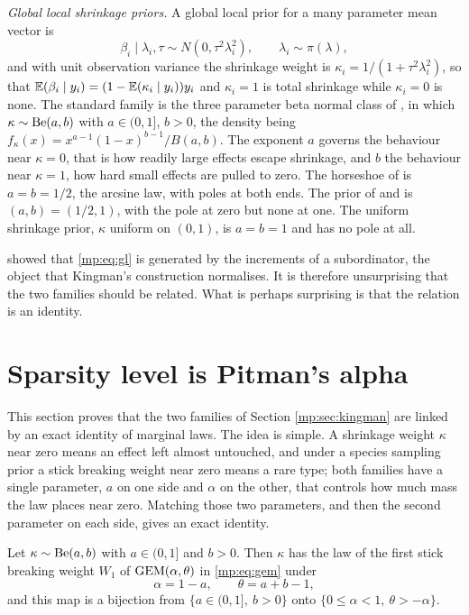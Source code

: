 \medskip
\noindent\emph{Global local shrinkage priors.} A global local prior for a many parameter
mean vector is
\begin{equation}
\beta_i\mid\lambda_i,\tau\sim N(0,\tau^2\lambda_i^2),\qquad \lambda_i\sim\pi(\lambda),
\label{mp:eq:gl}
\end{equation}
and with unit observation variance the shrinkage weight is
$\kappa_i=1/(1+\tau^2\lambda_i^2)$, so that $\mathbb{E}(\beta_i\mid y_i)=(1-\mathbb{E}(\kappa_i\mid y_i))y_i$
and $\kappa_i=1$ is total shrinkage while $\kappa_i=0$ is none. The standard family is the
three parameter beta normal class of \citet{mp:armagan2011}, in which
$\kappa\sim\mathrm{Be}(a,b)$ with $a\in(0,1]$, $b>0$, the density being
$f_\kappa(x)=x^{a-1}(1-x)^{b-1}/B(a,b)$. The exponent $a$ governs the behaviour near
$\kappa=0$, that is how readily large effects escape shrinkage, and $b$ the behaviour near
$\kappa=1$, how hard small effects are pulled to zero. The horseshoe of
\citet{mp:carvalho2010} is $a=b=1/2$, the arcsine law, with poles at both ends. The prior of
\citet{mp:strawderman1971} and \citet{mp:berger1980} is $(a,b)=(1/2,1)$, with the pole at
zero but none at one. The uniform shrinkage prior, $\kappa$ uniform on $(0,1)$, is
$a=b=1$ and has no pole at all.

\citet{mp:polson2012} showed that \eqref{mp:eq:gl} is generated by the increments of a
subordinator, the object that Kingman's construction normalises. It is therefore unsurprising that the two
families should be related. What is perhaps surprising is that the relation is an identity.

\section{Sparsity level is Pitman's alpha}
\label{mp:sec:main}

This section proves that the two families of Section \ref{mp:sec:kingman} are linked by an exact identity of marginal laws. The idea
is simple. A shrinkage weight $\kappa$ near zero means an effect left almost untouched, and
under a species sampling prior a stick breaking weight near zero means a rare type; both
families have a single parameter, $a$ on one side and $\alpha$ on the other, that controls
how much mass the law places near zero. Matching those two parameters, and then the second
parameter on each side, gives an exact identity.

\begin{theorem}
\label{mp:thm:main}
Let $\kappa\sim\mathrm{Be}(a,b)$ with $a\in(0,1]$ and $b>0$. Then $\kappa$ has the law of the first
stick breaking weight $W_1$ of $\mathrm{GEM}(\alpha,\theta)$ in \eqref{mp:eq:gem} under
\[
\alpha=1-a,\qquad \theta=a+b-1,
\]
and this map is a bijection from $\{a\in(0,1],\ b>0\}$ onto
$\{0\le\alpha<1,\ \theta>-\alpha\}$.
\end{theorem}

